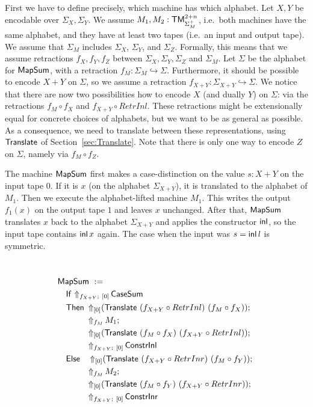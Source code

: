 First we have to define precisely, which machine has which alphabet.  Let $X, Y$ be encodable over $\Sigma_X, \Sigma_Y$.  We assume
$M_1, M_2 : \mathsf{TM}_{\Sigma_M^+}^{2+n}$, i.e.\ both machines have the same alphabet, and they have at least two tapes (i.e.\ an input and output tape).
We assume that $\Sigma_M$ includes $\Sigma_X$, $\Sigma_Y$, and $\Sigma_Z$.  Formally, this means that we assume retractions $f_X,f_Y,f_Z$ between
$\Sigma_X, \Sigma_Y, \Sigma_Z$ and $\Sigma_M$.  Let $\Sigma$ be the alphabet for $\MS{MapSum}$, with a retraction
$f_M : \Sigma_M \hookrightarrow \Sigma$.  Furthermore, it should be possible to encode $X+Y$ on $\Sigma$, so we assume a retraction
$f_{X+Y} : \Sigma_{X+Y} \hookrightarrow \Sigma$.  We notice that there are now two possibilities how to encode $X$ (and dually $Y$) on $\Sigma$: via
the retractions $f_M \circ f_X$ and $f_{X+Y} \circ RetrInl $.  These retractions might be extensionally equal for concrete choices of alphabets, but
we want to be as general as possible.  As a consequence, we need to translate between these representations, using $\mathsf{Translate}$ of
Section~\ref{sec:Translate}.  Note that there is only one way to encode $Z$ on $\Sigma$, namely via $f_M \circ f_Z $.

The machine $\MS{MapSum}$ first makes a case-distinction on the value $s:X+Y$ on the input tape $0$.  If it is $x$ (on the alphabet $\Sigma_{X+Y}$),
it is translated to the alphabet of $M_1$.  Then we execute the alphabet-lifted machine $M_1$.  This writes the output $f_1(x)$ on the output tape $1$
and leaves $x$ unchanged.  After that, $\MS{MapSum}$ translates $x$ back to the alphabet $\Sigma_{X+Y}$ and applies the constructor $\operatorname{\mathsf{inl}}$, so the
input tape contains $\operatorname{\mathsf{inl}} x$ again.  The case when the input was $s=\operatorname{\mathsf{inl}} l$ is symmetric.

\begin{definition}[$\MS{MapSum}$][MapSum]
  \label{def:MapSum}
  ~
  \begin{align*}
    & \MS{MapSum}~:= \\
    &\quad \MS{If}~{\LiftBoth{\MS{CaseSum}}{f_{X+Y}}{\Vector{0}}} \\
    &\quad \MS{Then}~ \LiftTapes{(\MS{Translate}~(f_{X+Y} \circ RetrInl)~(f_M \circ f_X))}{\Vector{0}} \Seq \\
    &\quad \phantom{\MS{Then}}~ \LiftAlphabet{M_1}{f_M} \Seq \\
    &\quad \phantom{\MS{Then}}~ \LiftTapes{(\MS{Translate}~(f_M \circ f_X)~(f_{X+Y} \circ RetrInl))}{\Vector{0}} \Seq \\
    &\quad \phantom{\MS{Then}}~ \LiftBoth{\MS{ConstrInl}}{f_{X+Y}}{\Vector{0}} \\
    &\quad \MS{Else}~~~ \LiftTapes{(\MS{Translate}~(f_{X+Y} \circ RetrInr)~(f_M \circ f_Y))}{\Vector{0}} \Seq \\
    &\quad \phantom{\MS{Then}}~ \LiftAlphabet{M_2}{f_M} \Seq \\
    &\quad \phantom{\MS{Then}}~ \LiftTapes{(\MS{Translate}~(f_M \circ f_Y)~(f_{X+Y} \circ RetrInr))}{\Vector{0}} \Seq \\
    &\quad \phantom{\MS{Then}}~ \LiftBoth{\MS{ConstrInr}}{f_{X+Y}}{\Vector{0}}
  \end{align*}
\end{definition}

